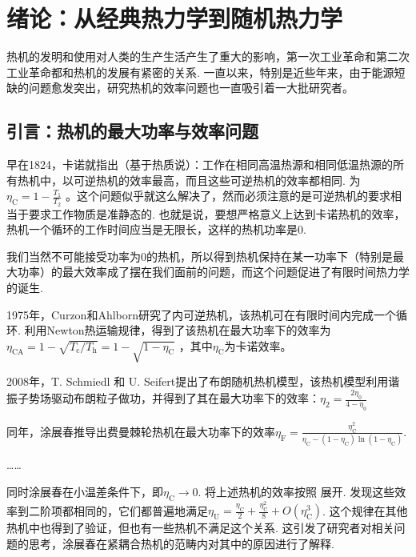 \chapter{绪论：从经典热力学到随机热力学}
热机的发明和使用对人类的生产生活产生了重大的影响，第一次工业革命和第二次工业革命都和热机的发展有紧密的关系. 一直以来，特别是近些年来，由于能源短缺的问题愈发突出，研究热机的效率问题也一直吸引着一大批研究者。

\section{引言：热机的最大功率与效率问题}
\quad 早在1824，卡诺就指出（基于热质说）\cite{2005}：工作在相同高温热源和相同低温热源的所有热机中，以可逆热机的效率最高，而且这些可逆热机的效率都相同. 为$\eta _{\text{C}}=1-\frac{T_1}{T_2}$ 。这个问题似乎就这么解决了，然而必须注意的是可逆热机的要求相当于要求工作物质是准静态的. 也就是说，要想严格意义上达到卡诺热机的效率，热机一个循环的工作时间应当是无限长，这样的热机功率是0.

我们当然不可能接受功率为0的热机，所以得到热机保持在某一功率下（特别是最大功率）的最大效率成了摆在我们面前的问题，而这个问题促进了有限时间热力学的诞生. 

1975年，Curzon和Ahlborn研究了内可逆热机\cite{Curzon1975}，该热机可在有限时间内完成一个循环. 利用Newton热运输规律，得到了该热机在最大功率下的效率为$\eta _{\mathrm{CA}}=1-\sqrt{T_{\mathrm{c}}/T_{\mathrm{h}}}=1-\sqrt{1-\eta _{\mathrm{C}}}$ ，其中$\eta _{\mathrm{C}}$为卡诺效率。

2008年，T. Schmiedl 和 U. Seifert提出了布朗随机热机模型\cite{Schmiedl2008}，该热机模型利用谐振子势场驱动布朗粒子做功，并得到了其在最大功率下的效率：$\eta_{2}=\frac{2 \eta_{0}}{4-\eta_{0}}$

同年，涂展春推导出费曼棘轮热机\cite{Tu2008}在最大功率下的效率$\eta _{\text{F}}=\frac{\eta _{\text{C}}^{2}}{\eta _{\text{C}}-\left( 1-\eta _{\text{C}} \right) \ln \left( 1-\eta _{\text{C}} \right)}$. \cite{Tu2020}

……



同时涂展春\cite{Tu2008}在小温差条件下，即$\eta _{\text{C}}\rightarrow 0$. 将上述热机的效率按照 展开. 发现这些效率到二阶项都相同的，它们都普遍地满足$\eta _{\text{U}}=\frac{\eta _{\text{C}}}{2}+\frac{\eta _{\text{C}}^{2}}{8}+O\left( \eta _{\text{C}}^{3} \right)$. 这个规律在其他热机中也得到了验证，但也有一些热机不满足这个关系. 这引发了研究者对相关问题的思考，涂展春在紧耦合热机的范畴内对其中的原因进行了解释.\cite{Tu2020}

